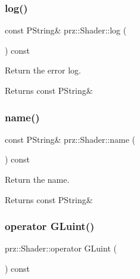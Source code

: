 \subsubsection{\texorpdfstring{log()}{log()}}
{\footnotesize\ttfamily const P\+String\& prz\+::\+Shader\+::log (\begin{DoxyParamCaption}{ }\end{DoxyParamCaption}) const\hspace{0.3cm}{\ttfamily [inline]}}



Return the error log. 

\begin{DoxyReturn}{Returns}
const P\+String\& 
\end{DoxyReturn}
\mbox{\label{classprz_1_1_shader_a2ba459fe4dc556e94ab73df91d2c0a4e}} 
\subsubsection{\texorpdfstring{name()}{name()}}
{\footnotesize\ttfamily const P\+String\& prz\+::\+Shader\+::name (\begin{DoxyParamCaption}{ }\end{DoxyParamCaption}) const\hspace{0.3cm}{\ttfamily [inline]}}



Return the name. 

\begin{DoxyReturn}{Returns}
const P\+String\& 
\end{DoxyReturn}
\mbox{\label{classprz_1_1_shader_ad9ff32ee5cd648fc9e4a2c554a754c0c}} 
\subsubsection{\texorpdfstring{operator GLuint()}{operator GLuint()}}
{\footnotesize\ttfamily prz\+::\+Shader\+::operator G\+Luint (\begin{DoxyParamCaption}{ }\end{DoxyParamCaption}) const\hspace{0.3cm}{\ttfamily [inline]}}



